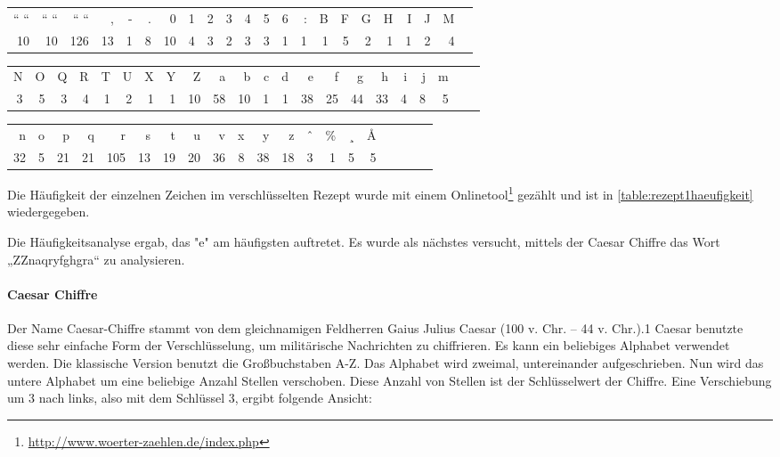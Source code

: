 \begin{table}[h]\footnotesize
\begin{tabular}{*{22}{r}}
  `` ``  &  `` ``  &  `` ``  &  ,  &  -  &  .  &  0  &  1  &  2  &  3  &  4  &  5  &  6  &  :  &  B  &  F  &  G  &  H & I & J  &  M \\
  10  &   10  &  126  &   13  &  1  &  8  &   10  &  4  &  3  &  2  &  3  &  3  &  1  &  1  &  1  &  5  &  2  &  1 & 1 & 2 & 4 \\
\end{tabular}

\begin{tabular}{*{22}{r}}
N  &  O  &  Q  &  R  &  T  &  U  &  X  &  Y  &  Z  &  a  &  b  &  c  &  d  &  e  &  f  &  g  &  h  &  i  &  j & m \\
3  &      5  &      3  &      4  &      1  &      2  &      1  &      1  &     10  &     58  &     10  &      1  &      1  &     38  &     25  &     44  &     33  &      4  &      8  &      5 \\
\end{tabular}

\begin{tabular}{*{20}{r}}
n  &  o  &  p  &  q  &  r  &  s  &  t  &  u  &  v  &  x  &  y  &  z  &  ˆ  &  \%  &  ¸  &  Å  \\
32  &      5  &     21  &     21  &    105  &     13  &     19  &     20  &     36  &      8  &     38  &     18  &      3  &      1  &      5  &      5  \\
\end{tabular}
\label{rezept1haeufigkeit}
\end{table}

Die Häufigkeit der einzelnen Zeichen im verschlüsselten Rezept wurde mit einem
Onlinetool\footnote{\url{http://www.woerter-zaehlen.de/index.php}} gezählt und
ist in \cref{table:rezept1haeufigkeit} wiedergegeben.

Die Häufigkeitsanalyse ergab, das "e" am häufigsten auftretet.
Es wurde als nächstes versucht, mittels der Caesar Chiffre das Wort
„ZZnaqryfghgra“ zu analysieren.

\paragraph{Caesar Chiffre}

Der Name Caesar-Chiffre stammt von dem gleichnamigen Feldherren Gaius Julius
Caesar (100 v. Chr. – 44 v. Chr.).1 Caesar benutzte diese sehr einfache Form der
Verschlüsselung, um militärische Nachrichten zu chiffrieren.  Es kann ein
beliebiges Alphabet verwendet werden. Die klassische Version benutzt die
Großbuchstaben A-Z. Das Alphabet wird zweimal, untereinander aufgeschrieben.
Nun wird das untere Alphabet um eine beliebige Anzahl Stellen verschoben. Diese
Anzahl von Stellen ist der Schlüsselwert der Chiffre. Eine Verschiebung um 3
nach links, also mit dem Schlüssel 3, ergibt folgende Ansicht:

